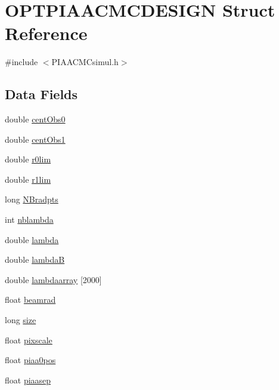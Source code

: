 \hypertarget{structOPTPIAACMCDESIGN}{\section{O\+P\+T\+P\+I\+A\+A\+C\+M\+C\+D\+E\+S\+I\+G\+N Struct Reference}
\label{structOPTPIAACMCDESIGN}
}


{\ttfamily \#include $<$P\+I\+A\+A\+C\+M\+Csimul.\+h$>$}

\subsection*{Data Fields}
\begin{DoxyCompactItemize}
\item 
double \hyperlink{structOPTPIAACMCDESIGN_ad8031116439ad3b191f5fb6e6cfe0070}{cent\+Obs0}
\item 
double \hyperlink{structOPTPIAACMCDESIGN_a4d8d03c42ff2aec6c5b974d80d086a5e}{cent\+Obs1}
\item 
double \hyperlink{structOPTPIAACMCDESIGN_a0f039998bd513a4a91d5d144ba51001c}{r0lim}
\item 
double \hyperlink{structOPTPIAACMCDESIGN_a4842ab89cd721c1c83af3d4b728ffcf6}{r1lim}
\item 
long \hyperlink{structOPTPIAACMCDESIGN_a8389b7bc4b26b28b6b95eed878237000}{N\+Bradpts}
\item 
int \hyperlink{structOPTPIAACMCDESIGN_a02144a94930448a77754dee947a8600e}{nblambda}
\item 
double \hyperlink{structOPTPIAACMCDESIGN_a64a6567f44c2102f913d378930c2c5f7}{lambda}
\item 
double \hyperlink{structOPTPIAACMCDESIGN_ac4a10cbfc3935db33fb2f3c5612fe0ef}{lambda\+B}
\item 
double \hyperlink{structOPTPIAACMCDESIGN_ae7e05c68253c7a637f90597b0be9bec7}{lambdaarray} \mbox{[}2000\mbox{]}
\item 
float \hyperlink{structOPTPIAACMCDESIGN_ac90bf363beaa0d44651ae1c69268de15}{beamrad}
\item 
long \hyperlink{structOPTPIAACMCDESIGN_a9a77cc42ff9de1dbd1d484e7020da6eb}{size}
\item 
float \hyperlink{structOPTPIAACMCDESIGN_a41ee229fbf9d612f8650c127b7ed022b}{pixscale}
\item 
float \hyperlink{structOPTPIAACMCDESIGN_a3b878597ef430b432a169fbd1138112a}{piaa0pos}
\item 
float \hyperlink{structOPTPIAACMCDESIGN_ab9b00e2fc69b7a0b11354d5cdf718635}{piaasep}

\end{DoxyCompactItemize}
